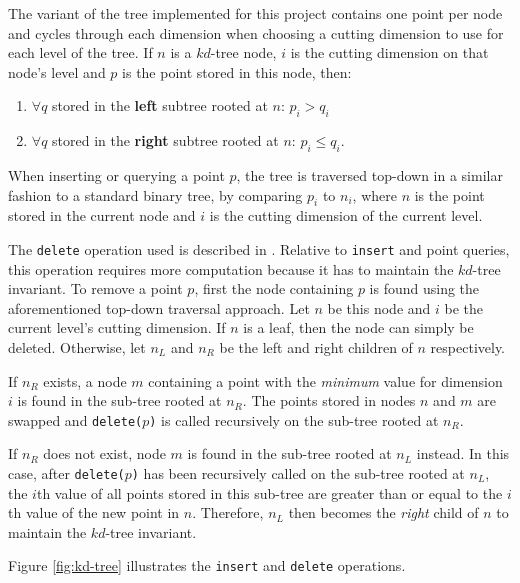 The variant of the tree implemented for this project contains one point per node and cycles through each dimension when choosing a cutting dimension to use for each level of the tree. If $n$ is a $kd$-tree node, $i$ is the cutting dimension on that node's level and $p$ is the point stored in this node, then:
\begin{enumerate}
	\item $\forall q$ stored in the \textbf{left} subtree rooted at $n$: $p_i > q_i$ 
	\item $\forall q$ stored in the \textbf{right} subtree rooted at $n$: $p_i \leq q_i$.
\end{enumerate}
When inserting or querying a point $p$, the tree is traversed top-down in a similar fashion to a standard binary tree, by comparing $p_i$ to $n_i$, where $n$ is the point stored in the current node and $i$ is the cutting dimension of the current level.

The \texttt{delete} operation used is described in \cite{kdtree-remove}. Relative to \texttt{insert} and point queries, this operation requires more computation because it has to maintain the $kd$-tree invariant. To remove a point $p$, first the node containing $p$ is found using the aforementioned top-down traversal approach. Let $n$ be this node and $i$ be the current level's cutting dimension. If $n$ is a leaf, then the node can simply be deleted. Otherwise, let $n_L$ and $n_R$ be the left and right children of $n$ respectively. 

If $n_R$ exists, a node $m$ containing a point with the \textit{minimum} value for dimension $i$ is found in the sub-tree rooted at $n_R$. The points stored in nodes $n$ and $m$ are swapped and \texttt{delete($p$)} is called recursively on the sub-tree rooted at $n_R$.

If $n_R$ does not exist, node $m$ is found in the sub-tree rooted at $n_L$ instead. In this case, after \texttt{delete($p$)} has been recursively called on the sub-tree rooted at $n_L$, the $i$th value of all points stored in this sub-tree are greater than or equal to the $i$th value of the new point in $n$. Therefore, $n_L$ then becomes the \textit{right} child of $n$ to maintain the $kd$-tree invariant. 

Figure \ref{fig:kd-tree} illustrates the \texttt{insert} and \texttt{delete} operations.

